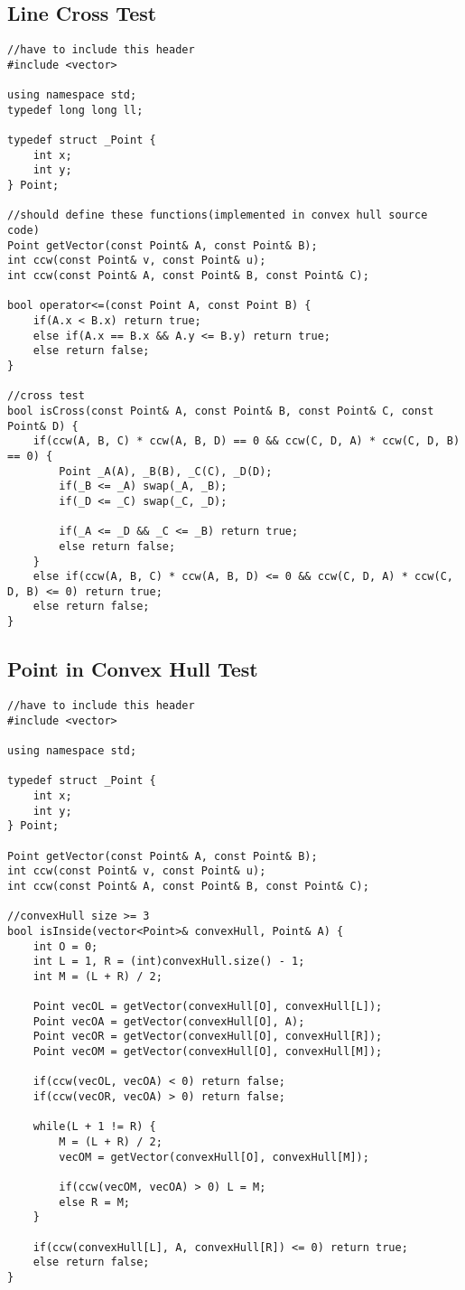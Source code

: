 \documentclass[landscape, 8pt, a4paper, oneside, twocolumn]{extarticle}
\begin{document}
\subsection{Line Cross Test}
\begin{verbatim}
//have to include this header
#include <vector>

using namespace std;
typedef long long ll;

typedef struct _Point {
    int x;
    int y;
} Point;

//should define these functions(implemented in convex hull source code)
Point getVector(const Point& A, const Point& B);
int ccw(const Point& v, const Point& u);
int ccw(const Point& A, const Point& B, const Point& C);

bool operator<=(const Point A, const Point B) {
    if(A.x < B.x) return true;
    else if(A.x == B.x && A.y <= B.y) return true;
    else return false;
}

//cross test
bool isCross(const Point& A, const Point& B, const Point& C, const Point& D) {
    if(ccw(A, B, C) * ccw(A, B, D) == 0 && ccw(C, D, A) * ccw(C, D, B) == 0) {
        Point _A(A), _B(B), _C(C), _D(D);
        if(_B <= _A) swap(_A, _B);
        if(_D <= _C) swap(_C, _D);

        if(_A <= _D && _C <= _B) return true;
        else return false;
    }
    else if(ccw(A, B, C) * ccw(A, B, D) <= 0 && ccw(C, D, A) * ccw(C, D, B) <= 0) return true;
    else return false;
}
\end{verbatim}

\subsection{Point in Convex Hull Test}
\begin{verbatim}
//have to include this header
#include <vector>

using namespace std;

typedef struct _Point {
    int x;
    int y;
} Point;

Point getVector(const Point& A, const Point& B);
int ccw(const Point& v, const Point& u);
int ccw(const Point& A, const Point& B, const Point& C);

//convexHull size >= 3
bool isInside(vector<Point>& convexHull, Point& A) {
    int O = 0;
    int L = 1, R = (int)convexHull.size() - 1;
    int M = (L + R) / 2;

    Point vecOL = getVector(convexHull[O], convexHull[L]);
    Point vecOA = getVector(convexHull[O], A);
    Point vecOR = getVector(convexHull[O], convexHull[R]);
    Point vecOM = getVector(convexHull[O], convexHull[M]);

    if(ccw(vecOL, vecOA) < 0) return false;
    if(ccw(vecOR, vecOA) > 0) return false;

    while(L + 1 != R) {
        M = (L + R) / 2;
        vecOM = getVector(convexHull[O], convexHull[M]);

        if(ccw(vecOM, vecOA) > 0) L = M;
        else R = M;
    }

    if(ccw(convexHull[L], A, convexHull[R]) <= 0) return true; 
    else return false;
}
\end{verbatim}
\end{document}
